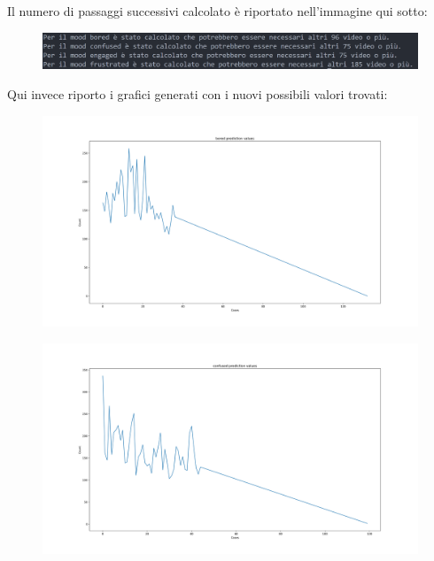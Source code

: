 \begin {itemize}
Il numero di passaggi successivi calcolato è riportato nell’immagine qui sotto:
\begin{figure}
    \begin{center}    
        \includegraphics[width=1\linewidth]{images/passaggi aggiuntivi.png}
    \end{center}
\end{figure}
Qui invece riporto i grafici generati con i nuovi possibili valori trovati:
\begin{figure}
    \begin{center}    
        \includegraphics[width=1\linewidth]{images/bored prediction values.png}
    \end{center}
\end{figure}
\begin{figure}
    \begin{center}    
        \includegraphics[width=1\linewidth]{images/confused prediction values.png}
    \end{center}

\end{figure}
\end{itemize}
